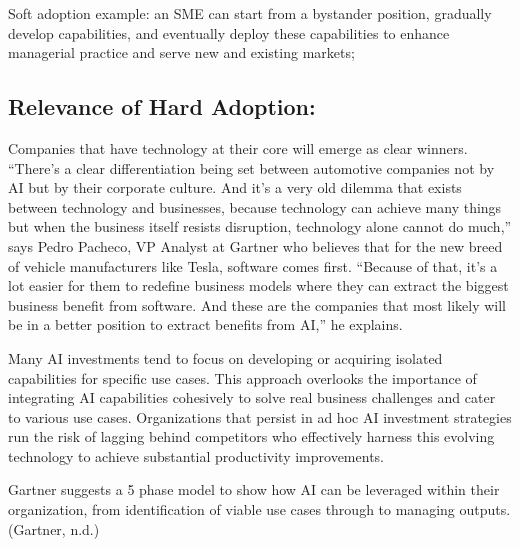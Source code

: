 \documentclass[
]{article}
\begin{document}
Soft adoption example: an SME can start from a bystander position, gradually develop capabilities, and eventually deploy these capabilities to enhance managerial practice and serve new and existing markets;

\hypertarget{relevance-of-hard-adoption}{%
\subsection*{Relevance of Hard Adoption:}\label{relevance-of-hard-adoption}}

Companies that have technology at their core will emerge as clear winners. ``There's a clear differentiation being set between automotive companies not by AI but by their corporate culture. And it's a very old dilemma that exists between technology and businesses, because technology can achieve many things but when the business itself resists disruption, technology alone cannot do much,'' says Pedro Pacheco, VP Analyst at Gartner who believes that for the new breed of vehicle manufacturers like Tesla, software comes first. ``Because of that, it's a lot easier for them to redefine business models where they can extract the biggest business benefit from software. And these are the companies that most likely will be in a better position to extract benefits from AI,'' he explains.

Many AI investments tend to focus on developing or acquiring isolated capabilities for specific use cases. This approach overlooks the importance of integrating AI capabilities cohesively to solve real business challenges and cater to various use cases. Organizations that persist in ad hoc AI investment strategies run the risk of lagging behind competitors who effectively harness this evolving technology to achieve substantial productivity improvements.

Gartner suggests a 5 phase model to show how AI can be leveraged within their organization, from identification of viable use cases through to managing outputs. (Gartner, n.d.)
\end{document}
